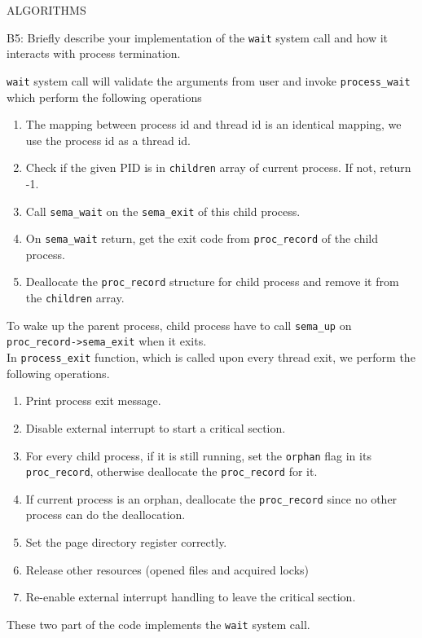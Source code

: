 \begin{aspect}{ALGORITHMS}
	\begin{qc}
		B5: Briefly describe your implementation of the \lstinline{wait} system call
		and how it interacts with process termination.
	\end{qc}
	\lstinline{wait} system call will validate the arguments from user and invoke \lstinline{process_wait} which perform the following operations
	\begin{enumerate}
		\item The mapping between process id and thread id is an identical mapping, we use the process id as a thread id.
		\item Check if the given PID is in \lstinline{children} array of current process. If not, return -1.
		\item Call \lstinline{sema_wait} on the \lstinline{sema_exit} of this child process.
		\item On \lstinline{sema_wait} return, get the exit code from \lstinline{proc_record} of the child process.
		\item Deallocate the \lstinline{proc_record} structure for child process and remove it from the \lstinline{children} array.
	\end{enumerate}
	To wake up the parent process, child process have to call \lstinline{sema_up} on \lstinline{proc_record->sema_exit} when it exits.\\
	In \lstinline{process_exit} function, which is called upon every thread exit, we perform the following operations.
	\begin{enumerate}
		\item Print process exit message.
		\item Disable external interrupt to start a critical section.
		\item For every child process,
		      if it is still running, set the \lstinline{orphan} flag in its \lstinline{proc_record},
		      otherwise deallocate the \lstinline{proc_record} for it.
		\item If current process is an orphan, deallocate the \lstinline{proc_record} since no other process can do the deallocation.
		\item Set the page directory register correctly.
		\item Release other resources (opened files and acquired locks)
		\item Re-enable external interrupt handling to leave the critical section.
	\end{enumerate}

	These two part of the code implements the \lstinline{wait} system call.


\end{aspect}
